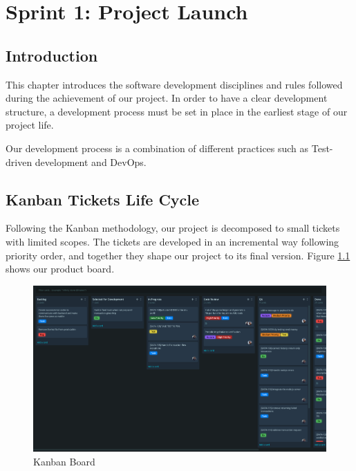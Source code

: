 
\setcounter{chapter}{2}
\chapter{Sprint 1: Project Launch}
\minitoc %
\graphicspath{{Chapter3/figures/}}

\pagestyle{fancy}
\fancyhf{}
\fancyhead[R]{\bfseries\rightmark}
\fancyfoot[R]{\thepage}
\renewcommand{\headrulewidth}{0.5pt}
\renewcommand{\footrulewidth}{0pt}
\renewcommand{\chaptermark}[1]{\markboth{\MakeUppercase{\chaptername~\thechapter. #1 }}{}}
\renewcommand{\sectionmark}[1]{\markright{\thechapter.\thesection~ #1}}

\begin{spacing}{1.2}


\section*{Introduction}
This chapter introduces the software development disciplines and rules followed during the achievement of our project. In order to have a clear development structure, a development process must be set in place in the earliest stage of our project life.

Our development process is a combination of different practices such as Test-driven development and DevOps.

\section{Kanban Tickets Life Cycle}
Following the Kanban methodology, our project is decomposed to small tickets with limited scopes. The tickets are developed in an incremental way following priority order, and together they shape our project to its final version.
Figure \ref{fig:kanban} shows our product board.
\begin{figure}[H]\centering
\includegraphics[scale=0.3]{kanban_board.png}
\caption{Kanban Board}
\label{fig:kanban}
\end{figure}

\end{spacing}
